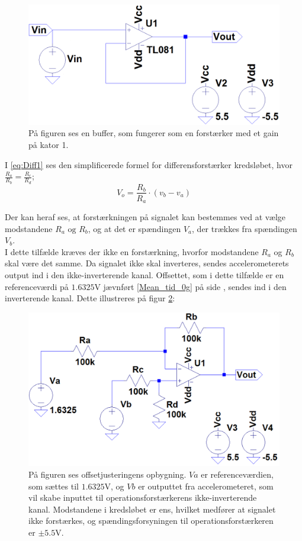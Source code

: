 \begin{figure}[H]
	\centering
	\includegraphics[scale=0.4]{figures/cProblemloesning/Buffer_LT.png}
	\caption{På figuren ses en buffer, som fungerer som en forstærker med et gain på kator 1.}
	\label{fig:Buffer}
\end{figure}
\noindent I \eqref{eq:Diff1} ses den simplificerede formel for differensforstærker kredsløbet, hvor $\frac{R_a}{R_b} = \frac{R_c}{R_d}$;
\begin{equation}\label{eq:Diff1}
V_o = \frac{R_b}{R_a} \cdot (v_b - v_a)
\end{equation}

\noindent Der kan heraf ses, at forstærkningen på signalet kan bestemmes ved at vælge modstandene $R_a\text{ og }R_b$, og at det er spændingen $V_{a}$, der trækkes fra spændingen $V_{b}$. \\
I dette tilfælde kræves der ikke en forstærkning, hvorfor modstandene $R_{a}$ og $R_{b}$ skal være det samme. Da signalet ikke skal inverteres, sendes accelerometerets output ind i den ikke-inverterende kanal. Offsettet, som i dette tilfælde er en referenceværdi på $1.6325$V jævnført \ref{Mean_tid_0g} på side \pageref{Mean_tid_0g}, sendes ind i den inverterende kanal. Dette illustreres på figur \ref{fig:Offset_generisk}:
\begin{figure}[H]
\centering
\includegraphics[scale=0.4]{figures/cProblemloesning/Offset_generisk.png}
\caption{På figuren ses offsetjusteringens opbygning. $Va$ er referenceværdien, som sættes til $1.6325$V, og $Vb$ er outputtet fra accelerometeret, som vil skabe inputtet til operationsforstærkerens ikke-inverterende kanal. Modstandene i kredsløbet er ens, hvilket medfører at signalet ikke forstærkes, og spændingsforsyningen til operationsforstærkeren er $\pm5.5$V.}
\label{fig:Offset_generisk}
\end{figure}

